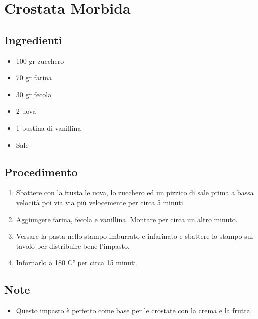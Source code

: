 \section{Crostata Morbida}
\subsection{Ingredienti}
\begin{itemize}
\item 100 gr zucchero  
\item 70 gr farina   
\item 30 gr fecola  
\item 2 uova  
\item 1 bustina di vanillina  
\item Sale
\end{itemize}
\subsection{Procedimento}
\begin{enumerate}
\item  Sbattere con la frusta le uova, lo zucchero ed un pizzico di sale prima a bassa velocità poi via via più velocemente per circa 5 minuti.  
\item  Aggiungere farina, fecola e vanillina. Montare per circa un altro minuto.  
\item  Versare la pasta nello stampo imburrato e infarinato e sbattere lo stampo sul tavolo per distribuire bene l'impasto.  
\item  Infornarlo a 180 C° per circa 15 minuti.
\end{enumerate}
\subsection{Note}
\begin{itemize}
\item Questo impasto è perfetto come base per le crostate con la crema e la frutta.
\end{itemize}
